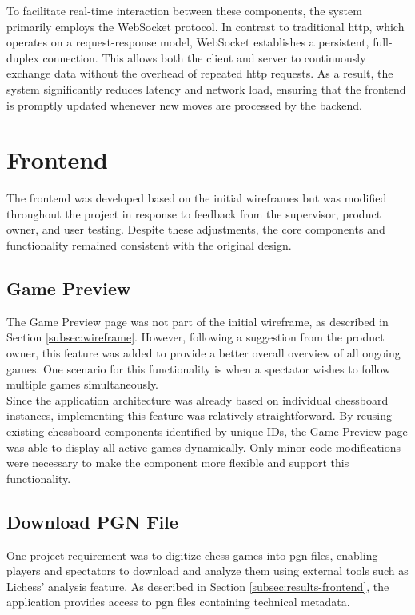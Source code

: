 To facilitate real-time interaction between these components, the system primarily employs the WebSocket protocol. In contrast to traditional \gls{http}, which operates on a request-response model, WebSocket establishes a persistent, full-duplex connection. This allows both the client and server to continuously exchange data without the overhead of repeated \gls{http} requests. As a result, the system significantly reduces latency and network load, ensuring that the frontend is promptly updated whenever new moves are processed by the backend.

\section{Frontend}
The frontend was developed based on the initial wireframes but was modified throughout the project in response to feedback from the supervisor, product owner, and user testing. Despite these adjustments, the core components and functionality remained consistent with the original design.

\subsection{Game Preview}
The Game Preview page was not part of the initial wireframe, as described in Section \ref{subsec:wireframe}. However, following a suggestion from the product owner, this feature was added to provide a better overall overview of all ongoing games. One scenario for this functionality is when a spectator wishes to follow multiple games simultaneously. \\

Since the application architecture was already based on individual chessboard instances, implementing this feature was relatively straightforward. By reusing existing chessboard components identified by unique IDs, the Game Preview page was able to display all active games dynamically. Only minor code modifications were necessary to make the component more flexible and support this functionality.

\subsection{Download PGN File}
One project requirement was to digitize chess games into \gls{pgn} files, enabling players and spectators to download and analyze them using external tools such as Lichess’ analysis feature. As described in Section \ref{subsec:results-frontend}, the application provides access to \gls{pgn} files containing technical metadata. \\

